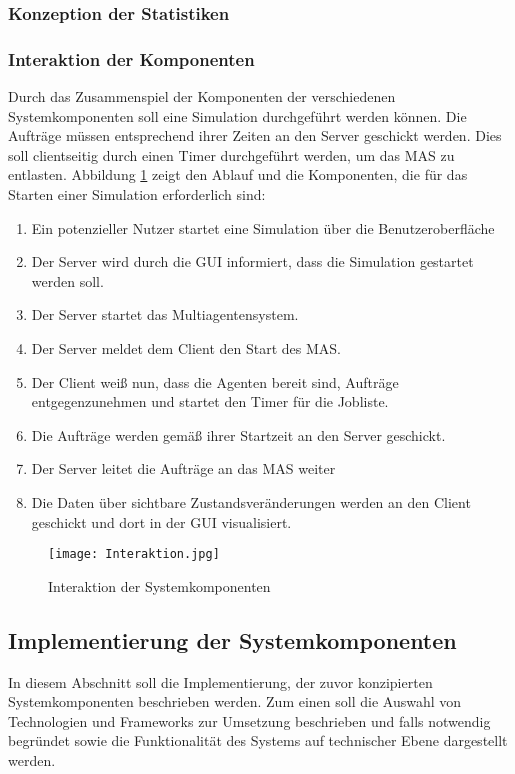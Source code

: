 \subsubsection{Konzeption der Statistiken}
\subsubsection{Interaktion der Komponenten}
Durch das Zusammenspiel der Komponenten der verschiedenen Systemkomponenten soll eine Simulation durchgeführt werden können. Die Aufträge müssen entsprechend ihrer Zeiten an den Server geschickt werden. Dies soll clientseitig durch einen Timer durchgeführt werden, um das MAS zu entlasten. Abbildung \ref{Int} zeigt den Ablauf und die Komponenten, die für das Starten einer Simulation erforderlich sind: 
\begin{enumerate}
\item Ein potenzieller Nutzer startet eine Simulation über die Benutzeroberfläche
\item Der Server wird durch die GUI informiert, dass die Simulation gestartet werden soll.
\item Der Server startet das Multiagentensystem.
\item Der Server meldet dem Client den Start des MAS.
\item Der Client weiß nun, dass die Agenten bereit sind, Aufträge entgegenzunehmen und startet den Timer für die Jobliste.
\item Die Aufträge werden gemäß ihrer Startzeit an den Server geschickt.
\item Der Server leitet die Aufträge an das MAS weiter
\item Die Daten über sichtbare Zustandsveränderungen werden an den Client geschickt und dort in der GUI visualisiert.
\end{enumerate}

\begin{figure}[h!]
	\centering
		\texttt{[image: Interaktion.jpg]}        
		\caption{Interaktion der Systemkomponenten}
	\label{Int}
\end{figure}
\newpage
\subsection{Implementierung der Systemkomponenten}
In diesem Abschnitt soll die Implementierung, der zuvor konzipierten Systemkomponenten beschrieben werden. Zum einen soll die Auswahl von Technologien und Frameworks zur Umsetzung beschrieben und falls notwendig begründet sowie die Funktionalität des Systems auf technischer Ebene dargestellt werden.
